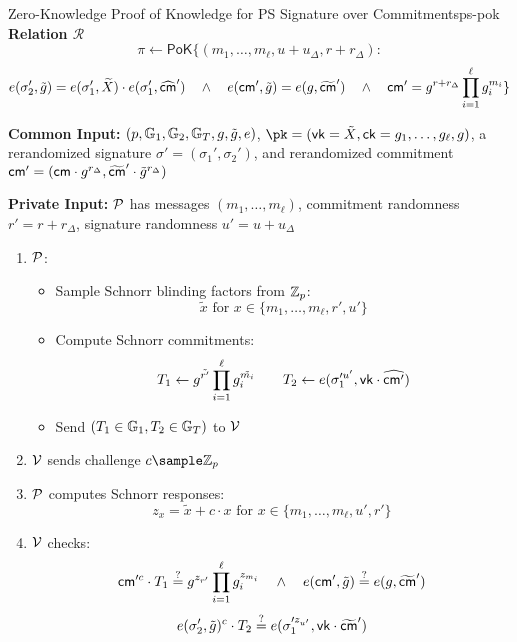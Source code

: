 \newpage
\begin{protocol}{Zero-Knowledge Proof of Knowledge for PS Signature over Commitments}{ps-pok}
    \textbf{Relation $\mathcal{R}$}
    \[
        \pi \gets \mathsf{PoK}\{(m_1,\ldots,m_\ell, u+u_\Delta, r+r_\Delta): 
    \]
    \[
         e(\sigma_2', \tilde{g}) = e(\sigma_1', \widetilde{X})\cdot e(\sigma_1', \widehat{\mathsf{cm}}') \quad \wedge \quad
        e(\mathsf{cm}', \tilde{g}) = e(g, \widetilde{\mathsf{cm}}') \quad \wedge \quad
        \mathsf{cm}' = g^{r+r_\Delta} \prod_{i=1}^\ell g_i^{m_i}
        \}
    \]

    \textbf{Common Input:} $(p, \mathbb{G}_1, \mathbb{G}_2, \mathbb{G}_T, g, \tilde{g}, e)$, $\pk = (\vk = \tilde{X}, \ck = g_1, \ldots, g_{\ell}, g)$, a rerandomized signature $\sigma' = (\sigma_1', \sigma_2')$, and rerandomized commitment $\mathsf{cm}' = (\mathsf{cm} \cdot g^{r_\Delta}, \widetilde{\mathsf{cm}}' \cdot \tilde{g}^{r_\Delta})$
    
    \textbf{Private Input:} $\mathcal{P}$ has messages $(m_1,\ldots,m_\ell)$, commitment randomness $r' = r + r_\Delta$, signature randomness $u' = u + u_\Delta$
    
    \begin{enumerate}
        \item $\mathcal{P}$:
        \begin{itemize}
            \item Sample Schnorr blinding factors from $\mathbb{Z}_p$:
            \[
                \tilde{x} \text{ for } x \in \{m_1,\ldots,m_\ell, r', u'\}
            \]
            \item Compute Schnorr commitments:
            \[
                T_1 \gets g^{\tilde{r'}} \prod_{i=1}^\ell g_i^{\tilde{m_i}} \qquad T_2 \gets e(\sigma_1'^{u'}, \mathsf{vk} \cdot \widehat{\mathsf{cm}'})
            \]
            \item Send $(T_1 \in \mathbb{G}_1, T_2 \in \mathbb{G}_T)$ to $\mathcal{V}$
        \end{itemize}
        
        \item $\mathcal{V}$ sends challenge $c \sample \Z_p$
        
        \item $\mathcal{P}$ computes Schnorr responses:
        \[
            z_x = \tilde{x} + c \cdot x \text{ for } x \in \{m_1,\ldots,m_\ell, u', r'\}
        \]
        
        \item $\mathcal{V}$ checks:
        \[
            \mathsf{cm}'^c \cdot T_1 \stackrel{?}{=} g^{z_{r'}} \prod_{i=1}^\ell g_i^{z_{m_i}}
            \quad \wedge \quad e(\mathsf{cm}', \tilde{g}) \stackrel{?}{=} e(g, \widetilde{\mathsf{cm}}')
        \]
        \[
            e(\sigma_2', \tilde{g})^c \cdot T_2 \stackrel{?}{=} e(\sigma_1'^{z_{u'}}, \mathsf{vk} \cdot \widetilde{\mathsf{cm}}')
        \]
    \end{enumerate}
\end{protocol}




